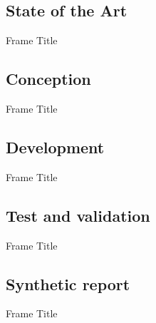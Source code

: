\documentclass{beamer}
\begin{document}
\subsection{State of the Art}
\begin{frame}{Frame Title}
    
\end{frame}

\subsection{Conception}
\begin{frame}{Frame Title}
    
\end{frame}

\subsection{Development}
\begin{frame}{Frame Title}
    
\end{frame}

\subsection{Test and validation}
\begin{frame}{Frame Title}
    
\end{frame}

\subsection{Synthetic report}
\begin{frame}{Frame Title}
    
\end{frame}
%   
%
%    
%    
%
%    
%
\end{document}
